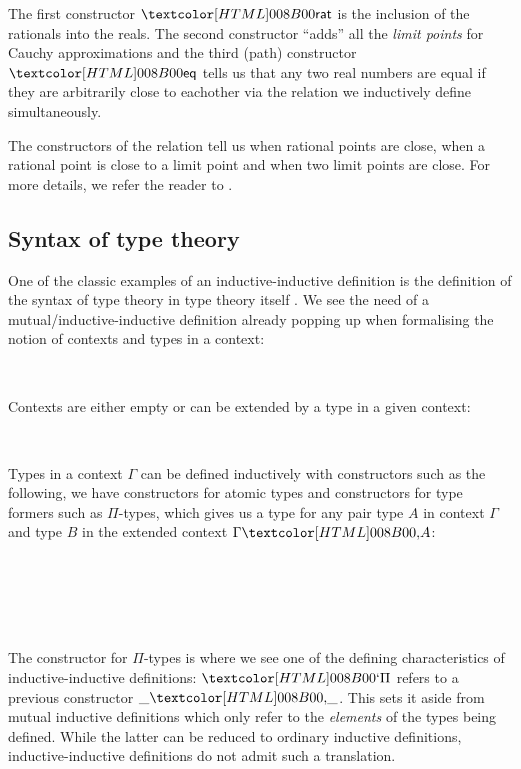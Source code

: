 The first constructor $\realrat$ is the inclusion of the rationals
into the reals. The second constructor ``adds'' all the \emph{limit
  points} for Cauchy approximations and the third (path) constructor
$\realeq$ tells us that any two real numbers are equal if they are
arbitrarily close to eachother via the relation we inductively define
simultaneously.
%
\begin{datatype}{\realrel{\epsilon}{\_}{\_}}{}
  \constrdots
\end{datatype}
%
The constructors of the relation tell us when rational points are
close, when a rational point is close to a limit point and when two
limit points are close. For more details, we refer the reader to
\cite{UFP2013}.

\subsection{Syntax of type theory}
\label{syntax-of-type-theory}

One of the classic examples of an inductive-inductive definition
\cite{NordvallForsberg2013} is the definition of the syntax of type
theory in type theory itself \cite{Danielsson2006}
\cite{Chapman2009}. We see the need of a mutual/inductive-inductive
definition already popping up when formalising the notion of contexts
and types in a context:
%
\begin{sorts}
  \sortnamety{\ttconty}{\Set} \\
  \sortnamety{\tttyty}{\ttconty \to \Set}
\end{sorts}
%
Contexts are either empty or can be extended by a type in a given
context:
%
\begin{datatype}{\ttconty}{}
  \constr{\ttnil}{\ttconty} \\
  \constr{\ttcons{\_}{\_}}{(\Gamma : \ttconty) \to \tttyty\ \Gamma \to \ttconty}
\end{datatype}
%
Types in a context $\Gamma$ can be defined inductively with
constructors such as the following, \ie we have constructors for
atomic types and constructors for type formers such as $\Pi$-types,
which gives us a type for any pair type $A$ in context $\Gamma$ and
type $B$ in the extended context $\ttcons{\Gamma}{A}$:
%
\begin{datatype}{\tttyty}{}
  \constr{\ttzero}{(\Gamma : \ttconty) \to \tttyty\ \Gamma} \\
  \constr{\ttone}{(\Gamma : \ttconty) \to \tttyty\ \Gamma} \\
  \constrdots \\
   \\
  \constrdots
\end{datatype}
%
The constructor for $\Pi$-types is where we see one of the defining
characteristics of inductive-inductive definitions: $\ttpi$ refers to
a previous constructor $\ttcons{\_}{\_}$. This sets it aside from
mutual inductive definitions which only refer to the \emph{elements}
of the types being defined. While the latter can be reduced to
ordinary inductive definitions, inductive-inductive definitions do not
admit such a translation.

